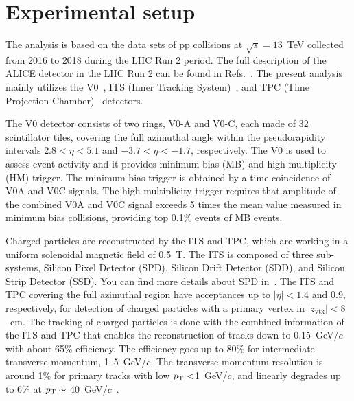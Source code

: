 

\section{Experimental setup}
\label{sec:experiment}

The analysis is based on the data sets of pp collisions at $\sqrt{s} = 13$~TeV collected from 2016 to 2018 during the LHC Run 2 period. The full description of the ALICE detector in the LHC Run 2 can be found in Refs.~\cite{Aamodt:2008zz,Abelev:2014ffa}. The present analysis mainly utilizes the V0~\cite{Abbas:2013taa}, ITS (Inner Tracking System)~\cite{aliceITS}, and TPC (Time Projection Chamber)~\cite{aliceTPC} detectors.

The V0 detector consists of two rings, V0-A and V0-C, each made of 32 scintillator tiles, covering the full azimuthal angle within the pseudorapidity intervals $2.8 < \eta < 5.1$ and $-3.7 < \eta < -1.7$, respectively. 
The V0 is used to assess event activity and it provides minimum bias (MB) and high-multiplicity (HM) trigger. The minimum bias trigger is obtained by a time coincidence of V0A and V0C signals. The high multiplicity trigger requires that amplitude of the combined V0A and V0C signal exceeds 5 times the mean value measured in minimum bias collisions, providing top 0.1\% events of MB events.

Charged particles are reconstructed by the ITS and TPC, which are working in a uniform solenoidal magnetic field of 0.5~T. The ITS is composed of three sub-systems, Silicon Pixel Detector (SPD), Silicon Drift Detector (SDD), and Silicon Strip Detector (SSD). You can find more details about SPD in~\cite{Santoro2009:ALICESPD}. The ITS and TPC covering the full azimuthal region have acceptances up to $|\eta| < 1.4$ and 0.9, respectively, for detection of charged particles with a primary vertex in $|z_\mathrm{vtx}| < 8$~cm. The tracking of charged particles is done with the combined information of the ITS and TPC that enables the reconstruction of tracks down to 0.15~GeV/$c$ with about 65\% efficiency. The efficiency goes up to 80\% for intermediate transverse momentum, 1--5~GeV/$c$. The transverse momentum resolution is around 1\% for primary tracks with low $p_\mathrm{T}<$1~GeV/$c$, and linearly degrades up to 6\% at $p_\mathrm{T} \sim$ 40~GeV/$c$~\cite{Contin_2012:ITSPTRES}.



